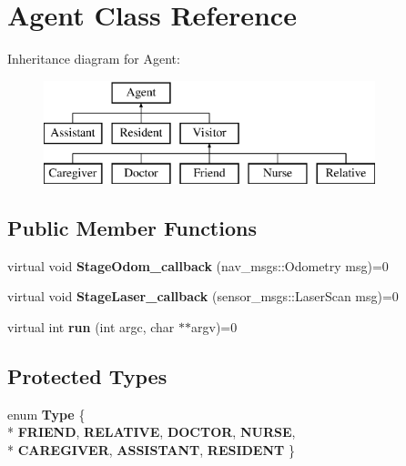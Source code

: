 \hypertarget{classAgent}{\section{Agent Class Reference}
\label{classAgent}
}
Inheritance diagram for Agent\-:\begin{figure}[H]
\begin{center}
\leavevmode
\includegraphics[height=3.000000cm]{classAgent}
\end{center}
\end{figure}
\subsection*{Public Member Functions}
\begin{DoxyCompactItemize}
\item 
\hypertarget{classAgent_a4b1182b9ee5dccaa871d71beef94a7d2}{virtual void {\bfseries Stage\-Odom\-\_\-callback} (nav\-\_\-msgs\-::\-Odometry msg)=0}\label{classAgent_a4b1182b9ee5dccaa871d71beef94a7d2}

\item 
\hypertarget{classAgent_adfe1de8bbeaa7e4a5f7f2ff3e45593e8}{virtual void {\bfseries Stage\-Laser\-\_\-callback} (sensor\-\_\-msgs\-::\-Laser\-Scan msg)=0}\label{classAgent_adfe1de8bbeaa7e4a5f7f2ff3e45593e8}

\item 
\hypertarget{classAgent_a70ae922d9ff12642634489b91ee5dbdf}{virtual int {\bfseries run} (int argc, char $\ast$$\ast$argv)=0}\label{classAgent_a70ae922d9ff12642634489b91ee5dbdf}

\end{DoxyCompactItemize}
\subsection*{Protected Types}
\begin{DoxyCompactItemize}
\item 
enum {\bfseries Type} \{ \\*
{\bfseries F\-R\-I\-E\-N\-D}, 
{\bfseries R\-E\-L\-A\-T\-I\-V\-E}, 
{\bfseries D\-O\-C\-T\-O\-R}, 
{\bfseries N\-U\-R\-S\-E}, 
\\*
{\bfseries C\-A\-R\-E\-G\-I\-V\-E\-R}, 
{\bfseries A\-S\-S\-I\-S\-T\-A\-N\-T}, 
{\bfseries R\-E\-S\-I\-D\-E\-N\-T}
 \}
\end{DoxyCompactItemize}
